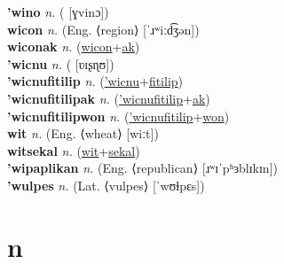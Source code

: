\textbf{'wino} \textit{n.} ( [ɣvinɔ])
 \label{'wino} \\
\textbf{wicon} \textit{n.} (Eng. ⟨region⟩ [ˈɹʷiːd͡ʒən])
 \label{wicon} \\
\textbf{wiconak} \textit{n.} (\hyperref[wicon]{wicon}+\hyperref[ak]{ak})
 \label{wiconak} \\
\textbf{'wicnu} \textit{n.} ( [ʋɪʂɳʊ])
 \label{'wicnu} \\
\textbf{'wicnufitilip} \textit{n.} (\hyperref['wicnu]{'wicnu}+\hyperref[fitilip]{fitilip})
 \label{'wicnufitilip} \\
\textbf{'wicnufitilipak} \textit{n.} (\hyperref['wicnufitilip]{'wicnufitilip}+\hyperref[ak]{ak})
 \label{'wicnufitilipak} \\
\textbf{'wicnufitilipwon} \textit{n.} (\hyperref['wicnufitilip]{'wicnufitilip}+\hyperref[won]{won})
 \label{'wicnufitilipwon} \\
\textbf{wit} \textit{n.} (Eng. ⟨wheat⟩ [wiːt])
 \label{wit} \\
\textbf{witsekal} \textit{n.} (\hyperref[wit]{wit}+\hyperref[sekal]{sekal})
 \label{witsekal} \\
\textbf{'wipaplikan} \textit{n.} (Eng. ⟨republican⟩ [ɹʷɪˈpʰɜblɪkɪn])
 \label{'wipaplikan} \\
\textbf{'wulpes} \textit{n.} (Lat. ⟨vulpes⟩ [ˈwʊɫpɛs])
 \label{'wulpes} 

\section{n}

